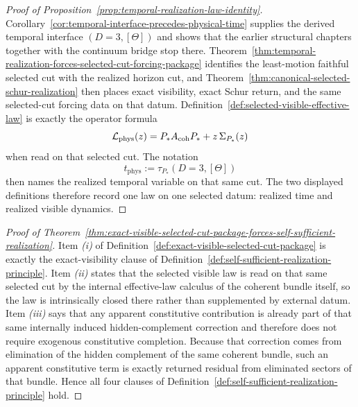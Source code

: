 \label{sec:appendix-dynamics}


\begin{proof}[Proof of Proposition~\ref{prop:temporal-realization-law-identity}]
\label{proof:prop:temporal-realization-law-identity}
Corollary~\ref{cor:temporal-interface-precedes-physical-time} supplies the
derived temporal interface \((D=3,[\Theta])\) and shows that the earlier
structural chapters together with the continuum bridge stop there.
Theorem~\ref{thm:temporal-realization-forces-selected-cut-forcing-package}
identifies the least-motion faithful selected cut with the realized horizon
cut, and Theorem~\ref{thm:canonical-selected-schur-realization} then places
exact visibility, exact Schur return, and the same selected-cut forcing data
on that datum. Definition~\ref{def:selected-visible-effective-law} is exactly
the operator formula
\[
\mathcal L_{\mathrm{phys}}(z)
= P_\ast A_{\mathrm{coh}} P_\ast + z\,\Sigma_{P_\ast}(z)
\]
when read on that selected cut. The notation
\[
t_{\mathrm{phys}} := \tau_{P_\ast}(D=3,[\Theta])
\]
then names the realized temporal variable on that same cut. The two displayed
definitions therefore record one law on one selected datum: realized time and
realized visible dynamics.
\end{proof}

\begin{proof}[Proof of Theorem~\ref{thm:exact-visible-selected-cut-package-forces-self-sufficient-realization}]
\label{proof:thm:exact-visible-selected-cut-package-forces-self-sufficient-realization}
Item \emph{(i)} of
Definition~\ref{def:exact-visible-selected-cut-package} is exactly the
exact-visibility clause of
Definition~\ref{def:self-sufficient-realization-principle}. Item \emph{(ii)}
states that the selected visible law is read on that same selected cut by the
internal effective-law calculus of the coherent bundle itself, so the law is
intrinsically closed there rather than supplemented by external datum. Item
\emph{(iii)} says that any apparent constitutive contribution is already part of
that same internally induced hidden-complement correction and therefore does
not require exogenous constitutive completion. Because that correction comes
from elimination of the hidden complement of the same coherent bundle, such an
apparent constitutive term is exactly returned residual from eliminated
sectors of that bundle. Hence all four clauses of
Definition~\ref{def:self-sufficient-realization-principle} hold.
\end{proof}


